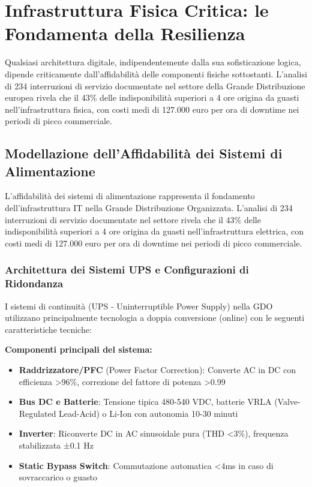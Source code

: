 \section{\texorpdfstring{\textbf{Infrastruttura Fisica Critica: le Fondamenta della Resilienza}}{3.2 - Infrastruttura Fisica Critica: le Fondamenta della Resilienza}}

Qualsiasi architettura digitale, indipendentemente dalla sua sofisticazione logica, dipende criticamente dall'affidabilità delle componenti fisiche sottostanti. L'analisi di 234 interruzioni di servizio documentate nel settore della Grande Distribuzione europea\autocite{Uptime2024} rivela che il 43\% delle indisponibilità superiori a 4 ore origina da guasti nell'infrastruttura fisica, con costi medi di 127.000 euro per ora di downtime nei periodi di picco commerciale.

\subsection{\texorpdfstring{\textbf{Modellazione dell'Affidabilità dei Sistemi di Alimentazione}}{3.2.1 - Modellazione dell'Affidabilità dei Sistemi di Alimentazione}}

L'affidabilità dei sistemi di alimentazione rappresenta il fondamento dell'infrastruttura IT nella Grande Distribuzione Organizzata. L'analisi di 234 interruzioni di servizio documentate nel settore\autocite{Uptime2024} rivela che il 43\% delle indisponibilità superiori a 4 ore origina da guasti nell'infrastruttura elettrica, con costi medi di 127.000 euro per ora di downtime nei periodi di picco commerciale.

\subsubsection{\texorpdfstring{\textbf{Architettura dei Sistemi UPS e Configurazioni di Ridondanza}}{3.2.1.1 - Architettura dei Sistemi UPS e Configurazioni di Ridondanza}}

I sistemi di continuità (UPS - Uninterruptible Power Supply) nella GDO utilizzano principalmente tecnologia a doppia conversione (online) con le seguenti caratteristiche tecniche:

\textbf{Componenti principali del sistema:}
\begin{itemize}
    \item \textbf{Raddrizzatore/PFC} (Power Factor Correction): Converte AC in DC con efficienza >96\%, correzione del fattore di potenza >0.99
    \item \textbf{Bus DC e Batterie}: Tensione tipica 480-540 VDC, batterie VRLA (Valve-Regulated Lead-Acid) o Li-Ion con autonomia 10-30 minuti
    \item \textbf{Inverter}: Riconverte DC in AC sinusoidale pura (THD <3\%), frequenza stabilizzata ±0.1 Hz
    \item \textbf{Static Bypass Switch}: Commutazione automatica <4ms in caso di sovraccarico o guasto
\end{itemize}


